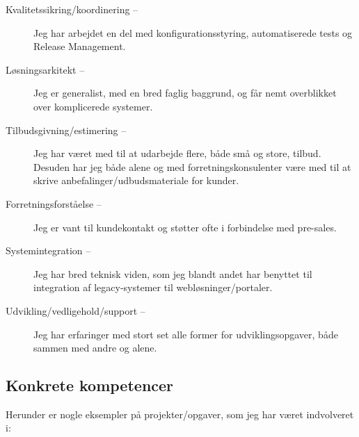 \documentclass[a4paper,11pt]{article}
\begin{document}
\begin{description}

  \item[Kvalitetssikring/koordinering --] Jeg har arbejdet en del
    med konfigurationsstyring, automatiserede tests og Release
    Management.

  \item[Løsningsarkitekt --] Jeg er generalist, med en bred faglig
    baggrund, og får nemt overblikket over komplicerede systemer.

  \item[Tilbudsgivning/estimering --] Jeg har været med til at
    udarbejde flere, både små og store, tilbud. Desuden har jeg både
    alene og med forretningskonsulenter være med til at skrive
    anbefalinger/udbudsmateriale for kunder.

  \item[Forretningsforståelse --] Jeg er vant til kundekontakt og
    støtter ofte i forbindelse med pre-sales.

  \item[Systemintegration --] Jeg har bred teknisk viden, som jeg
    blandt andet har benyttet til integration af legacy-systemer til
    webløsninger/portaler.

  \item[Udvikling/vedligehold/support --] Jeg har erfaringer med
    stort set alle former for udviklingsopgaver, både sammen med
    andre og alene.

\end{description}

\subsection*{Konkrete kompetencer}

Herunder er nogle eksempler på projekter/opgaver, som jeg har været
indvolveret i:
\end{document}
